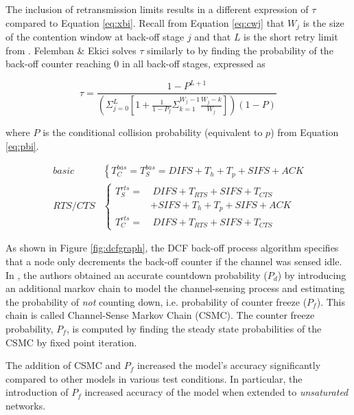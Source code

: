 The inclusion of retransmission limits results in a different expression of
$\tau$ compared to Equation \ref{eq:xbi}. Recall from Equation \ref{eq:cwj}
that $W_j$ is the size of the contention window at back-off stage $j$ and that
$L$ is the short retry limit from \cite{654749}. Felemban \& Ekici solves
$\tau$ similarly to \cite{bianchi} by finding the probability of the back-off
counter reaching 0 in all back-off stages, expressed as

\begin{equation} \label{eq:xfe}
	\tau = \frac{1-P^{L+1}}{
		(\Sigma^L_{j=0}
			[1 + \frac{1}{1-P_f}
				\Sigma^{W_j-1}_{k=1} \frac{W_j-k}{W_j}
			]
		)(1-P)}
\end{equation}

where $P$ is the conditional collision probability (equivalent to $p$) from
Equation \ref{eq:pbi}.

\begin{align}  \label{eq:tfe}
	\mathit{basic} & \left\{
	        T^{bas}_{C} = T^{bas}_{S} = \mathit{DIFS} + T_h + T_p + \mathit{SIFS} + \mathit{ACK}
	\right. \\
	\mathit{RTS/CTS} & \left\{
	    \begin{aligned}
	        T^{rts}_{S} = & ~ \mathit{DIFS} + T_\mathit{RTS} + \mathit{SIFS} + T_\mathit{CTS} \\ & + \mathit{SIFS} + T_h + T_p + \mathit{SIFS} + \mathit{ACK}  \\
	        T^{rts}_{C} = & ~ \mathit{DIFS} + T_\mathit{RTS} + \mathit{SIFS} + T_\mathit{CTS}
	    \end{aligned}
	\right.
\end{align}

As shown in Figure \ref{fig:dcfgraph}, the DCF back-off process algorithm
specifies that a node only decrements the back-off counter if the channel was
sensed idle. In \cite{felemban}, the authors obtained an accurate countdown
probability ($P_d$) by introducing an additional markov chain to model the
channel-sensing process and estimating the probability of \emph{not} counting
down, i.e. probability of counter freeze ($P_f$). This chain is called
Channel-Sense Markov Chain (CSMC). The counter freeze probability, $P_f$, is
computed by finding the steady state probabilities of the CSMC by fixed point
iteration.

The addition of CSMC and $P_f$ increased the model's accuracy significantly
compared to other models in various test conditions. In particular, the
introduction of $P_f$ increased accuracy of the model when extended to
\emph{unsaturated} networks.


